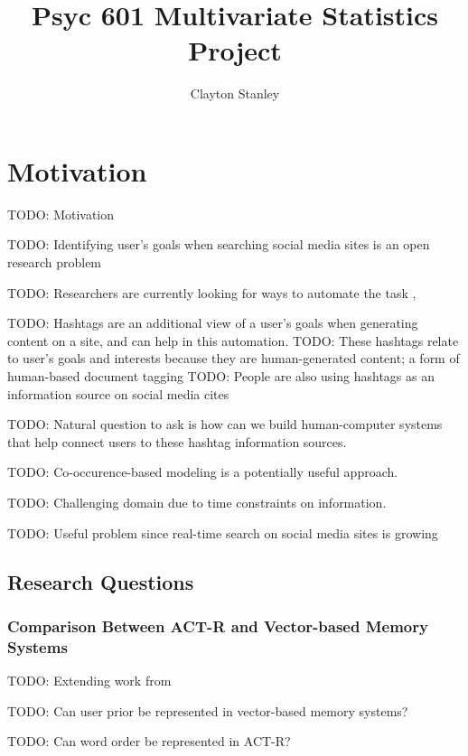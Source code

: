 \documentclass[man]{apa6}
\title{Psyc 601 Multivariate Statistics Project}
\author{Clayton Stanley}
\affiliation{Rice University}
\begin{document}
\maketitle

\tableofcontents
\newpage

\section{Motivation}

TODO: Motivation

TODO: Identifying user's goals when searching social media sites is an open research problem \cite{Rose2004}

TODO: Researchers are currently looking for ways to automate the task \cite{Lee2005}, \cite{Jansen2008}

TODO: Hashtags are an additional view of a user's goals when generating content on a site, and can help in this automation.
TODO: These hashtags relate to user's goals and interests because they are human-generated content; a form of human-based document tagging \cite{Chang2010}
TODO: People are also using hashtags as an information source on social media cites \cite{Diakopoulos2010} \cite{Kwak2010}

TODO: Natural question to ask is how can we build human-computer systems that help connect users to these hashtag information sources.

TODO: Co-occurence-based modeling is a potentially useful approach. \cite{Efron2010}

TODO: Challenging domain due to time constraints on information. \cite{Bauer2012}

TODO: Useful problem since real-time search on social media sites is growing \cite{Jansen2011}

\subsection{Research Questions}

\subsubsection{Comparison Between ACT-R and Vector-based Memory Systems}

TODO: Extending work from \cite{Rutledge2008}

TODO: Can user prior be represented in vector-based memory systems?

TODO: Can word order be represented in ACT-R?
\end{document}
